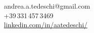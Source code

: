 \small %
\MVAt\ {\small andrea.a.tedeschi@gmail.com} \\[0.4ex]
\Telefon\ +39\,331\,457\,3469 \\[0.5ex]
\faLinkedin\ \href{https://www.linkedin.com/in/aatedeschi/}{linkedin.com/in/aatedeschi/} \\[0.1ex]
